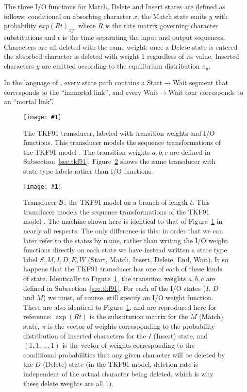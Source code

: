 \documentclass{article}
\newcommand{\secref}[1]{Subsection~\ref{sec.#1}}
\newcommand{\figref}[1]{Figure~\ref{Figures.#1}}
\newcommand{\figlabel}[1]{\label{Figures.#1}}
\newcommand{\easyfig}[4]{
\begin{figure}
\texttt{[image: \#1]}
\caption{ \figlabel{#3} #4}
\end{figure}}
\newcommand{\widepdffig}[2]{\easyfig{#1-fig.pdf}{width=\textwidth}{#1}{#2}}
\newcommand\tkf{{\cal B}}
\begin{document}
The three I/O functions for Match, Delete and Insert states are defined as follows:
conditional on absorbing character $x$, the Match state emits  $y$ with probability
$exp(Rt)_{xy}$, where $R$ is the rate matrix governing character substitutions and 
$t$ is the time separating the input and output sequences. 
Characters are all deleted with the same weight: once a Delete state is entered the 
absorbed character is deleted with weight 1 regardless of its value.  
Inserted characters $y$ are emitted according to the equilibrium distribution $\pi_y$.

In the language of \cite{ThorneEtal91}, every state path contains a Start$\to$Wait segment that corresponds to the ``immortal link'',
and every Wait$\to$Wait tour corresponds to an ``mortal link''.

\widepdffig{tkf91}{The TKF91 transducer, labeled with transition weights and I/O functions.  
This transducer models the sequence transformations of the TKF91 model \cite{ThorneEtal91}.
The transition weights $a,b,c$ are defined in \secref{tkf91}.
\figref{tkf91-labeled} shows the same transducer with state type labels rather than I/O functions.}



\widepdffig{tkf91-labeled}{
Transducer $\tkf$, the TKF91 model on a branch of length $t$.
This transducer models the sequence transformations of the TKF91 model \cite{ThorneEtal91}.
The machine shown here is identical to that of \figref{tkf91} in nearly all respects.
The only difference is this: in order that we can later refer to the states by name,
rather than writing the I/O weight functions directly on each state
we have instead written a state type label
 $S,M,I,D,E,W$ (Start, Match, Insert, Delete, End, Wait).
It so happens that the TKF91 transducer has one of each of these kinds of state.
Identically to \figref{tkf91}, the transition weights $a,b,c$ are defined in \secref{tkf91}.
For each of the I/O states ($I$, $D$ and $M$) we must, of course, still specify an I/O weight function.
These are also identical to \figref{tkf91}, and are reproduced here for reference:
 $\exp(Rt)$ is the substitution matrix for the $M$ (Match) state,
 $\pi$ is the vector of weights
  corresponding to the probability distribution of inserted characters for the $I$ (Insert) state,
 and
 $(1,1,\ldots,1)$
 is the vector of weights corresponding to
 the conditional probabilities that any given character will be deleted by the $D$ (Delete) state
 (in the TKF91 model, deletion rate is independent of the actual character being deleted,
 which is why these delete weights are all 1).
}
\end{document}
